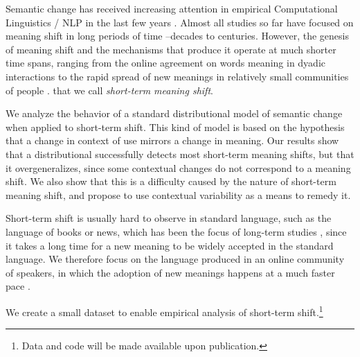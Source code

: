 Semantic change has received increasing attention in empirical Computational Linguistics / NLP in the last few years \cite{tang2018state}. Almost all studies so far have focused on meaning shift in long periods of time --decades to centuries. However, the genesis of meaning shift and the mechanisms that produce it operate at much shorter time spans, ranging
from the online agreement on words meaning in dyadic interactions \cite{brennan1996conceptual} to the rapid spread of new meanings in relatively small communities of people \cite{del2017semantic,del2018road}.  that we call \textit{short-term meaning shift}.

We  analyze the
 behavior of a standard distributional model of semantic change when
 applied to short-term shift.
This kind of model is based on the hypothesis that a change in context of use mirrors a change in meaning.
Our results show that a distributional successfully detects most short-term meaning shifts, but that it overgeneralizes, since some contextual changes do not correspond to a meaning shift.
We also show that this is a difficulty caused by the nature of short-term meaning shift, and propose to use contextual variability as a means to remedy it.

Short-term shift is usually hard to observe in standard language, such
as the language of books or news, which has been the focus of
long-term studies \cite{hamilton2016diachronic,kulkarni2015statistically}, since
it takes a long time for a new meaning to be widely accepted in the standard language. 
We therefore focus on the language produced in an online community of speakers, in which the 
adoption of new meanings happens at a much faster pace \cite{Clark96,hasan2009}.

We create a small dataset to enable empirical analysis of short-term
shift.\footnote{Data and code will be made available upon
publication.}


